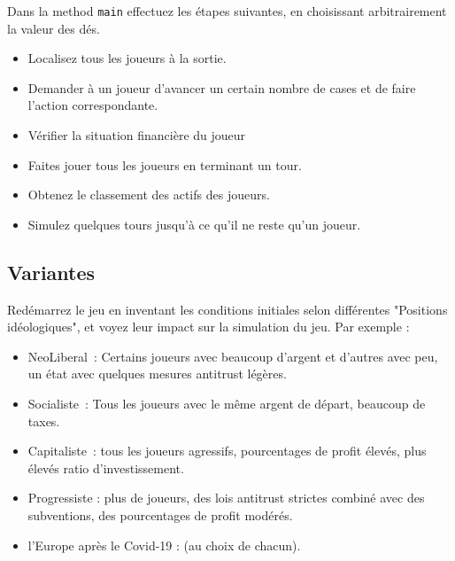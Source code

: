 \documentclass[12pt]{article}
\begin{document}
 Dans la method \texttt{main} effectuez les étapes suivantes, en choisissant arbitrairement la valeur des dés.
 \begin{itemize}
\item   Localisez tous les joueurs à la sortie.
\item    Demander à un joueur d'avancer un certain nombre de cases et de faire l'action correspondante.
\item    Vérifier la situation financière du joueur
\item    Faites jouer tous les joueurs en terminant un tour.
\item    Obtenez le classement des actifs des joueurs.
\item Simulez quelques tours jusqu'à ce qu'il ne reste qu'un joueur.
\end{itemize}


\subsection{Variantes}
Redémarrez le jeu en inventant les conditions initiales selon différentes
"Positions idéologiques", et voyez leur impact sur la simulation du jeu. Par
exemple :
\begin{itemize}
  \item NeoLiberal~: Certains joueurs avec beaucoup d'argent et d'autres avec peu, un état avec quelques
mesures antitrust légères.
  \item Socialiste~: Tous les joueurs avec le même argent de départ, beaucoup de taxes.
  \item Capitaliste~: tous les joueurs agressifs, pourcentages de profit élevés, plus élevés
ratio d'investissement.
  \item Progressiste : plus de joueurs, des lois antitrust strictes
combiné avec des subventions, des pourcentages de profit modérés.
  \item l'Europe après le Covid-19 : (au choix de chacun).
\end{itemize}
\end{document}
